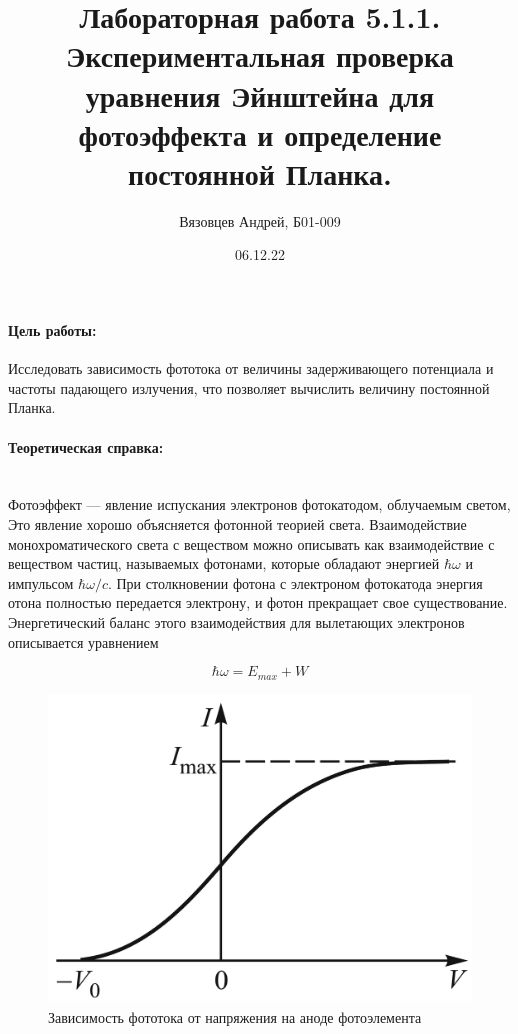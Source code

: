\documentclass[a4paper, 12pt]{article}
\author{Вязовцев Андрей, Б01-009}
\date{06.12.22}
\title{Лабораторная работа 5.1.1. Экспериментальная проверка уравнения Эйнштейна для фотоэффекта и определение постоянной Планка.}
\newcommand{\parag}[1]{\paragraph*{#1:}}
\begin{document}
\maketitle

\parag {Цель работы} Исследовать зависимость фототока от величины задерживающего потенциала и частоты падающего излучения, что позволяет вычислить величину постоянной Планка.


\parag {Теоретическая справка} ~\\

Фотоэффект --- явление испускания электронов фотокатодом, облучаемым светом,  Это явление хорошо объясняется фотонной теорией света. Взаимодействие монохроматического света с веществом можно описывать
как взаимодействие с веществом частиц, называемых фотонами, которые обладают энергией $ \hbar \omega $ и импульсом $ \hbar\omega/c $. При столкновении фотона с электроном фотокатода энергия отона полностью передается электрону, и фотон прекращает свое существование. Энергетический баланс этого взаимодействия для вылетающих электронов
описывается уравнением

\begin{equation}\label{energy balance}
\hbar \omega = E_{max} + W
\end{equation}

\begin{figure}[!h]
    \centering
    \includegraphics[scale=0.3]{I(V)}
    \caption{Зависимость фототока от напряжения на аноде фотоэлемента}
    \label{ris I(V)}
\end{figure}
\end{document}
